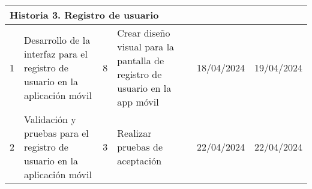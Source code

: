 \begin{longtable}{|p{0.5cm}|p{2cm}|p{1cm}|p{3cm}|p{1cm}|p{1cm}|}
    \multicolumn{6}{|l|}{\textbf{Historia 3. Registro de usuario }}                                                                                                                                                                                                                                                                                                                                              \\ \hline
    1                                        & Desarrollo de la interfaz para el registro de usuario en la aplicación móvil & 8                                                              & Crear diseño visual para la pantalla de registro de usuario en la app móvil & 18/04/2024                                                    & 19/04/2024                                                          \\ \hline
    2                                        & Validación y pruebas para el registro de usuario en la aplicación móvil      & 3                                                              & Realizar pruebas de aceptación                                              & 22/04/2024                                                    & 22/04/2024                                                          \\ \hline
\end{longtable}